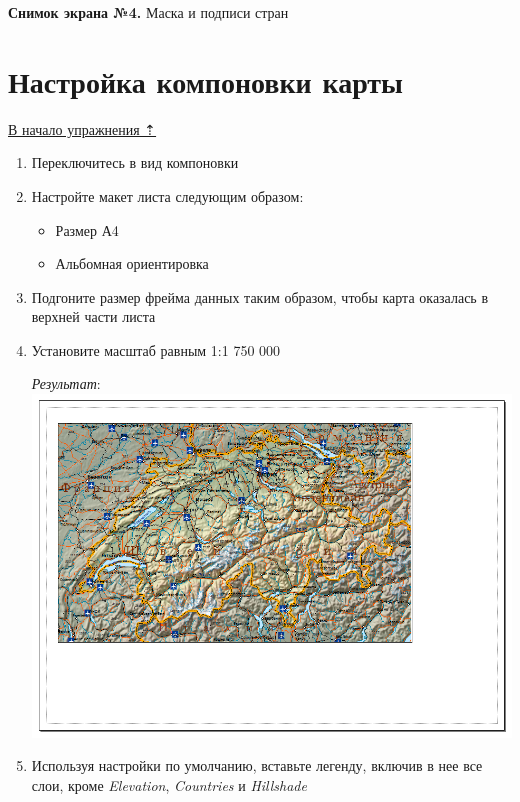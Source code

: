 \documentclass[12pt,]{book}
\providecommand{\tightlist}{%
  \setlength{\itemsep}{0pt}\setlength{\parskip}{0pt}}
\begin{document}
\textbf{Снимок экрана №4.} Маска и подписи стран

\hypertarget{map-design-general-layout}{%
\section{Настройка компоновки карты}\label{map-design-general-layout}}

\protect\hyperlink{map-design-general}{В начало упражнения ⇡}

\begin{enumerate}
\def\labelenumi{\arabic{enumi}.}
\item
  Переключитесь в вид компоновки
\item
  Настройте макет листа следующим образом:

  \begin{itemize}
  \tightlist
  \item
    Размер А4
  \item
    Альбомная ориентировка
  \end{itemize}
\item
  Подгоните размер фрейма данных таким образом, чтобы карта оказалась в верхней части листа
\item
  Установите масштаб равным 1:1 750 000

  \emph{Результат}:
  \includegraphics{images/Ex02/image25.png}
\item
  Используя настройки по умолчанию, вставьте легенду, включив в нее все слои, кроме \emph{Elevation}, \emph{Countries} и \emph{Hillshade}


\end{enumerate}
\end{document}
